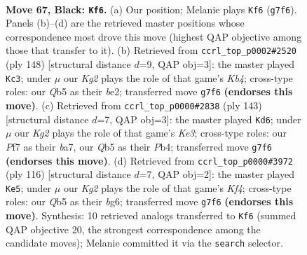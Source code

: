 \documentclass[11pt]{article}
\begin{document}
\clearpage

\begin{figure}[p]\centering
\begin{subfigure}{0.46\textwidth}\centering
\resizebox{\linewidth}{!}{%
\newchessgame
\chessboard[
  setfen={7b/5pk1/3P4/1q6/8/7K/8/8 b - - 4 67},
  showmover=false,
  pgfstyle=straightmove, color=movearrow, markmove={g7-f6}
]}
\caption{}
\end{subfigure}\hfill
\begin{subfigure}{0.46\textwidth}\centering
\resizebox{\linewidth}{!}{%
\newchessgame
\chessboard[
  setfen={8/8/8/1PB1k3/1K6/3p4/4b3/8 w - - 0 75},
  showmover=false,
  pgfstyle=straightmove, color=movearrow, markmove={b4-c3}
]}
\caption{}
\end{subfigure}
\\[4pt]
\begin{subfigure}{0.46\textwidth}\centering
\resizebox{\linewidth}{!}{%
\newchessgame
\chessboard[
  setfen={6K1/B7/4k3/5b2/1p6/1P6/8/8 b - - 0 72},
  showmover=false,
  pgfstyle=straightmove, color=movearrow, markmove={e6-d6}
]}
\caption{}
\end{subfigure}\hfill
\begin{subfigure}{0.46\textwidth}\centering
\resizebox{\linewidth}{!}{%
\newchessgame
\chessboard[
  setfen={8/8/5Pbp/8/5K2/k5B1/8/8 w - - 11 59},
  showmover=false,
  pgfstyle=straightmove, color=movearrow, markmove={f4-e5}
]}
\caption{}
\end{subfigure}
\caption{\textbf{Move 67, Black: \texttt{Kf6}.} (a) Our position; Melanie plays \texttt{Kf6} (\texttt{g7f6}). Panels (b)--(d) are the retrieved master positions whose correspondence most drove this move (highest QAP objective among those that transfer to it). (b) Retrieved from \texttt{ccrl\_top\_p0002\#2520} (ply 148) [structural distance $d$=9, QAP obj=3]: the master played \texttt{Kc3}; under $\mu$ our \emph{Kg2} plays the role of that game's \emph{Kb4}; cross-type roles: our \emph{Q}b5 as their \emph{b}e2; transferred move \texttt{g7f6} \textbf{(endorses this move)}. (c) Retrieved from \texttt{ccrl\_top\_p0000\#2838} (ply 143) [structural distance $d$=7, QAP obj=3]: the master played \texttt{Kd6}; under $\mu$ our \emph{Kg2} plays the role of that game's \emph{Ke3}; cross-type roles: our \emph{P}f7 as their \emph{b}a7, our \emph{Q}b5 as their \emph{P}b4; transferred move \texttt{g7f6} \textbf{(endorses this move)}. (d) Retrieved from \texttt{ccrl\_top\_p0000\#3972} (ply 116) [structural distance $d$=7, QAP obj=2]: the master played \texttt{Ke5}; under $\mu$ our \emph{Kg2} plays the role of that game's \emph{Kf4}; cross-type roles: our \emph{Q}b5 as their \emph{b}g6; transferred move \texttt{g7f6} \textbf{(endorses this move)}. Synthesis: 10 retrieved analogs transferred to \texttt{Kf6} (summed QAP objective 20, the strongest correspondence among the candidate moves); Melanie committed it via the \texttt{search} selector.}
\label{fig:thought-m133}
\end{figure}
\end{document}
